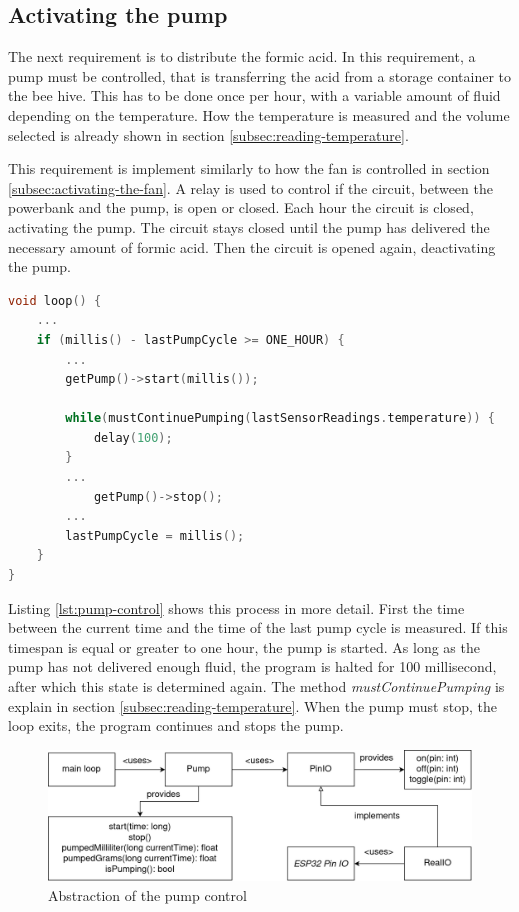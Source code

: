 \subsection{Activating the pump}\label{subsec:activating-the-pump}

The next requirement is to distribute the formic acid.
In this requirement, a pump must be controlled, that is transferring the acid from a storage container to the bee hive.
This has to be done once per hour, with a variable amount of fluid depending on the temperature.
How the temperature is measured and the volume selected is already shown in section \ref{subsec:reading-temperature}.

This requirement is implement similarly to how the fan is controlled in section \ref{subsec:activating-the-fan}.
A relay is used to control if the circuit, between the powerbank and the pump, is open or closed.
Each hour the circuit is closed, activating the pump.
The circuit stays closed until the pump has delivered the necessary amount of formic acid.
Then the circuit is opened again, deactivating the pump.

\begin{lstlisting}[label={lst:pump-control},language=C++, caption=Controling the pump]
void loop() {
    ...
    if (millis() - lastPumpCycle >= ONE_HOUR) {
        ...
        getPump()->start(millis());

        while(mustContinuePumping(lastSensorReadings.temperature)) {
            delay(100);
        }
        ...
            getPump()->stop();
        ...
        lastPumpCycle = millis();
    }
}
\end{lstlisting}

Listing \ref{lst:pump-control} shows this process in more detail.
First the time between the current time and the time of the last pump cycle is measured.
If this timespan is equal or greater to one hour, the pump is started.
As long as the pump has not delivered enough fluid, the program is halted for 100 millisecond, after which this state is determined again.
The method \textit{mustContinuePumping} is explain in section \ref{subsec:reading-temperature}.
When the pump must stop, the loop exits, the program continues and stops the pump.

\newpage

\begin{figure}
    \centering
    \includegraphics[width=\textwidth]{img/pump-control}
    \caption{Abstraction of the pump control}
    \label{fig:abstraction-of-pump}
\end{figure}

